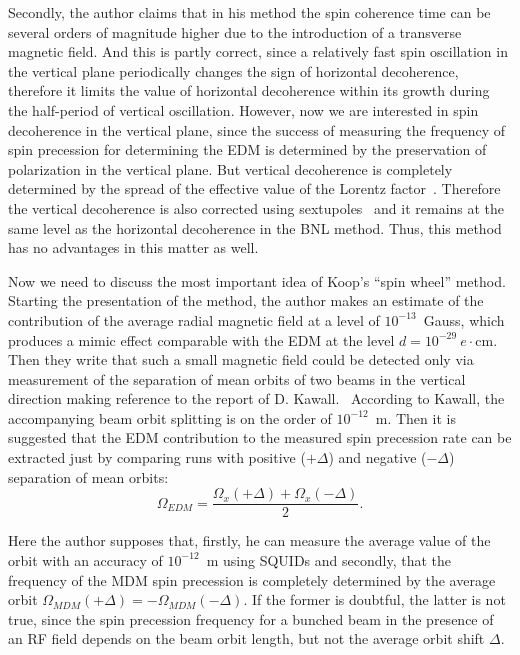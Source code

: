 \documentclass[a4paper]{jpconf}
\newcommand{\W}{\Omega}
\begin{document}
Secondly, the author claims that in his method the spin coherence time can be several orders of magnitude higher due to the introduction of a transverse magnetic field. And this is partly correct, since a relatively fast spin oscillation in the vertical plane periodically changes the sign of horizontal decoherence, therefore it limits the value of horizontal decoherence within its growth during the half-period of vertical oscillation. However, now we are interested in spin decoherence in the vertical plane, since the success of measuring the frequency of spin precession for determining the EDM is determined by the preservation of polarization in the vertical plane. But vertical decoherence is completely determined by the spread of the effective value of the Lorentz factor~\cite{Senichev:FDM}. Therefore the vertical decoherence is also corrected using sextupoles~\cite[p.~40]{Aksentev:Thesis} and it remains at the same level as the horizontal decoherence in the BNL method. Thus, this method has no advantages in this matter as well.

Now we need to discuss the most important idea of Koop’s ``spin wheel'' method. Starting the presentation of the method, the author makes an estimate of the contribution of the average radial magnetic field at a level of $10^{-13}$~Gauss, which produces a mimic effect comparable with the EDM at the level $d=10^{-29}~e\cdot$cm. Then they write that such a small magnetic field could be detected only via measurement of the separation of mean orbits of two beams in the vertical direction making reference to the report of D. Kawall.~\cite{Kawall} According to Kawall, the accompanying beam orbit splitting is on the order of $10^{-12}$~m. Then it is suggested that the EDM contribution to the measured spin precession rate can be extracted just by comparing runs with positive ($+\Delta$)  and negative ($-\Delta$) separation of mean orbits:
\begin{equation*}
	\W_{EDM} = \frac{\W_x(+\Delta) + \W_x(-\Delta)}{2}.
\end{equation*}

Here the author supposes that, firstly, he can measure the average value of the orbit with an accuracy of $10^{-12}$~m using SQUIDs and secondly, that the frequency of the MDM spin precession is completely determined by the average orbit $\W_{MDM}(+\Delta) = -\W_{MDM}(-\Delta)$. If the former is doubtful, the latter is not true, since the spin precession frequency for a bunched beam in the presence of an RF field depends on the beam orbit length, but not the average orbit shift $\Delta$.
\end{document}
